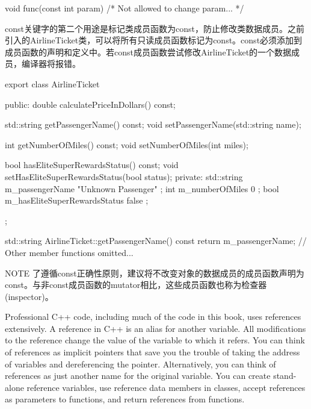 \begin{cpp}
void func(const int param) { /* Not allowed to change param... */ }
\end{cpp}


const关键字的第二个用途是标记类成员函数为const，防止修改类数据成员。之前引入的AirlineTicket类，可以将所有只读成员函数标记为const。const必须添加到成员函数的声明和定义中。若const成员函数尝试修改AirlineTicket的一个数据成员，编译器将报错。

\begin{cpp}
export class AirlineTicket
{
    public:
        double calculatePriceInDollars() const;

        std::string getPassengerName() const;
        void setPassengerName(std::string name);

        int getNumberOfMiles() const;
        void setNumberOfMiles(int miles);

        bool hasEliteSuperRewardsStatus() const;
        void setHasEliteSuperRewardsStatus(bool status);
    private:
        std::string m_passengerName { "Unknown Passenger" };
        int m_numberOfMiles { 0 };
        bool m_hasEliteSuperRewardsStatus { false };
};

std::string AirlineTicket::getPassengerName() const
{
    return m_passengerName;
}
// Other member functions omitted...
\end{cpp}

\begin{myNotic}{NOTE}
了遵循const正确性原则，建议将不改变对象的数据成员的成员函数声明为const。与非const成员函数的mutator相比，这些成员函数也称为检查器(inspector)。
\end{myNotic}


Professional C++ code, including much of the code in this book, uses references extensively. A reference in C++ is an alias for another variable. All modifications to the reference change the value of the variable to which it refers. You can think of references as implicit pointers that save you the trouble of taking the address of variables and dereferencing the pointer. Alternatively, you can think of references as just another name for the original variable. You can create stand-alone reference variables, use reference data members in classes, accept references as parameters to functions, and return references from functions.


